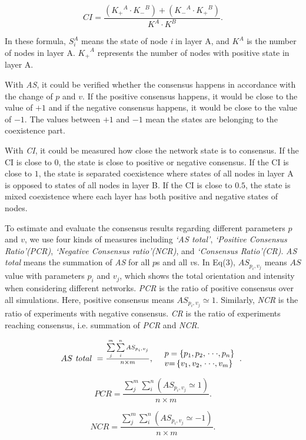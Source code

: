 \begin{equation}
CI = \frac{{({K_ + }^A \cdot {K_ - }^B) + ({K_ - }^A \cdot {K_ + }^B)}}{{{K^A} \cdot {K^B}}}.
\end{equation}

In these formula, $S_i^A$ means the state of node \textit{i} in layer A, and $K^A$ is the number of nodes in layer A. ${K_ + }^A$ represents the number of nodes with positive state in layer A.   

With \textit{AS}, it could be verified whether the consensus happens in accordance with the change of $p$ and $v$.  If the positive consensus happens, it would be close to the value of $+1$ and if the negative consensus happens, it would be close to the value of $-1$. The values between $+1$ and $-1$ mean the states are belonging to the coexistence part.

With \textit{CI}, it could be measured how close the network state is to consensus. If the CI is close to $0$, the state is close to positive or negative consensus. If the CI is close to $1$, the state is separated coexistence where states of all nodes in layer A is opposed to states of all nodes in layer B. If the CI is close to $0.5$, the state is mixed coexistence where each layer has both positive and negative states of nodes.






To estimate and evaluate the consensus results regarding different parameters $p$ and $v$, we use four kinds of measures including \textit{`AS total'}, \textit{`Positive Consensus Ratio'(PCR)}, \textit{`Negative Consensus ratio'(NCR)}, and \textit{`Consensus Ratio'(CR)}. \textit{AS total} means the summation of \textit{AS} for all $p$s and all $v$s. In Eq(3), ${A{S_{{p _i},{v _j}}}}$ means $AS$ value with parameters $p_i$ and $v_j$, which shows the total orientation and intensity when considering different networks. \textit{PCR} is the ratio of positive consensus over all simulations. Here, positive consensus means  ${A{S_{{p _i},{v _j}}} \simeq  1}$. Similarly, \textit{NCR} is the ratio of experiments with negative consensus. \textit{CR} is the ratio of experiments reaching consensus, i.e. summation of \textit{PCR} and \textit{NCR}.

\begin{equation}
\begin{array}{cl}
AS\mbox{ \textit{total} } = \frac{{\sum\limits_j^m {\sum\limits_i^n {A{S_{{p _i},{v _j}}}} } }}{{n \times m }}, &
\begin{array}{l}
p  = \left\{ {{p _{\rm{1}}},{p _{\rm{2}}},\left. {\cdot\cdot\cdot,{p _n}} \right\}} \right.\\
v {\rm{ = }}\left\{ {{v _{\rm{1}}},{v _{\rm{2}}},\left. {\cdot\cdot\cdot,{v _m}} \right\}} \right.
\end{array}.\
\end{array}
\end{equation}

\begin{equation}
PCR = \frac{{\sum\limits_j^m {\sum\limits_i^n {(A{S_{{p _i},{v _j}}} \simeq  1)} } }}{{n \times m}}.
\end{equation}

\begin{equation}
NCR = \frac{{\sum\limits_j^m {\sum\limits_i^n {(A{S_{{p _i},{v _j}}} \simeq   - 1)} } }}{{n \times m}}.
\end{equation}



    
